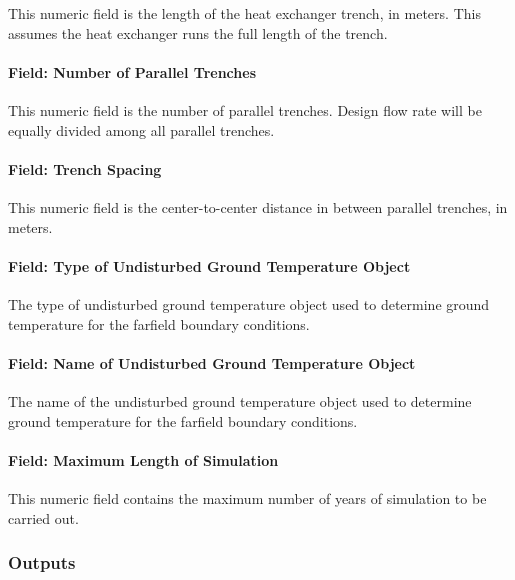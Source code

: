 This numeric field is the length of the heat exchanger trench, in meters. This assumes the heat exchanger runs the full length of the trench.

\paragraph{Field: Number of Parallel Trenches}\label{field-number-of-parallel-trenches}

This numeric field is the number of parallel trenches. Design flow rate will be equally divided among all parallel trenches.

\paragraph{Field: Trench Spacing}\label{field-trench-spacing}

This numeric field is the center-to-center distance in between parallel trenches, in meters.

\paragraph{Field: Type of Undisturbed Ground Temperature Object}\label{field-type-of-undisturbed-ground-temperature-object}

The type of undisturbed ground temperature object used to determine ground temperature for the farfield boundary conditions.

\paragraph{Field: Name of Undisturbed Ground Temperature Object}\label{field-name-of-undisturbed-ground-temperature-object}

The name of the undisturbed ground temperature object used to determine ground temperature for the farfield boundary conditions.

\paragraph{Field: Maximum Length of Simulation}\label{field-maximum-length-of-simulation-1}

This numeric field contains the maximum number of years of simulation to be carried out.

\subsubsection{Outputs}\label{outputs-11-000}

